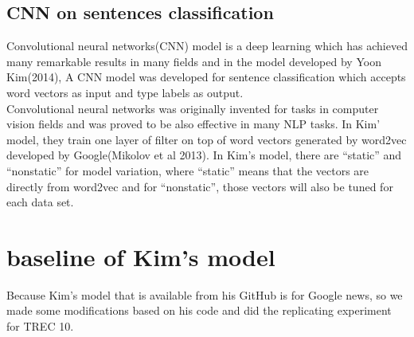 \documentclass[twoside]{article}
\begin{document}
\begin{multicols}{2}
\subsection{CNN on sentences classification}
Convolutional neural networks(CNN) model is a deep learning which has achieved many remarkable results in many fields and in the model developed by Yoon Kim(2014), A CNN model was developed for sentence classification which accepts word vectors as input and type labels as output.
\\Convolutional neural networks was originally invented for tasks in computer vision fields and was proved to be also effective in many NLP tasks. In Kim' model, they train one layer of filter on top of word vectors generated by word2vec developed by Google(Mikolov et al 2013). In Kim's model, there are ``static'' and ``nonstatic'' for model variation, where ``static'' means that the vectors are directly from word2vec and for ``nonstatic'', those vectors will also be tuned for each data set.



\section{baseline of Kim's model}
Because Kim's model that is available from his GitHub is for Google news, so we made some modifications based on his code and did the replicating experiment for TREC 10.


\end{multicols}
\end{document}
